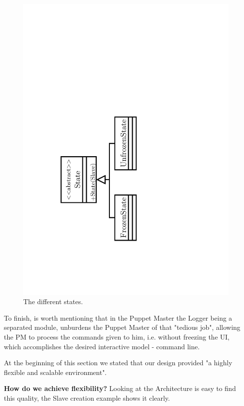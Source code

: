 \documentclass[times, 10pt,twocolumn]{article}
\begin{document}
\begin{figure}[h]
	\centering
	\includegraphics[angle=0, scale=0.45]{"Architecture/State"}
	\caption{The different states.} 
	\label{fig:state}
\end{figure}


To finish, is worth mentioning that in the Puppet Master the Logger being a separated module, unburdens the Puppet Master of that "tedious job", allowing the PM to process the commands given to him, i.e. without freezing the UI, which accomplishes the desired interactive model - command line.


At the beginning of this section we stated that our design provided "a highly flexible and scalable environment".

\textbf{How do we achieve flexibility?} Looking at the Architecture is easy to find this quality, the Slave creation example shows it clearly.
\end{document}
